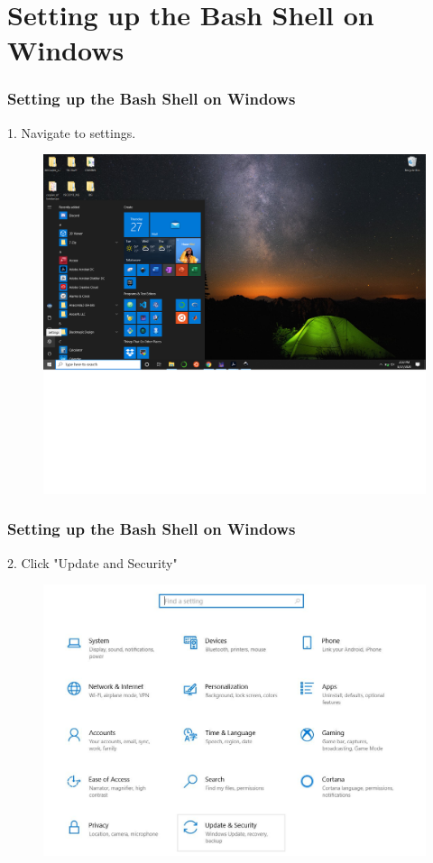 \documentclass{if-beamer}
\begin{document}
\section{Setting up the Bash Shell on Windows}
\begin{frame}
\frametitle{Setting up the Bash Shell on Windows}

1. Navigate to settings.
\begin{figure}
	\centering
	\includegraphics[width=\textwidth]{figures/step1.png}
\end{figure}
\end{frame}

\begin{frame}
\frametitle{Setting up the Bash Shell on Windows}
2. Click "Update and Security"
\begin{figure}
	\centering
	\includegraphics[width=.75\textwidth]{figures/step2.jpg}
\end{figure}
\end{frame}
\end{document}
